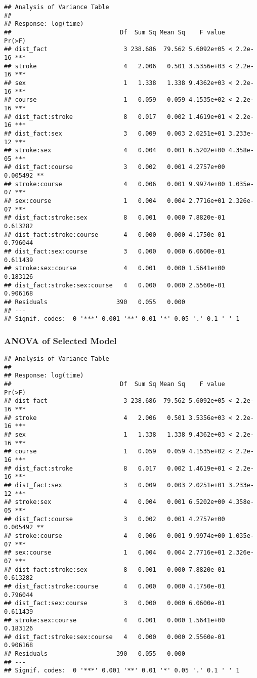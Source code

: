 \documentclass[a4paper,11pt]{article}
\begin{document}
\begin{verbatim}
## Analysis of Variance Table
##
## Response: log(time)
##                              Df  Sum Sq Mean Sq    F value    Pr(>F)
## dist_fact                     3 238.686  79.562 5.6092e+05 < 2.2e-16 ***
## stroke                        4   2.006   0.501 3.5356e+03 < 2.2e-16 ***
## sex                           1   1.338   1.338 9.4362e+03 < 2.2e-16 ***
## course                        1   0.059   0.059 4.1535e+02 < 2.2e-16 ***
## dist_fact:stroke              8   0.017   0.002 1.4619e+01 < 2.2e-16 ***
## dist_fact:sex                 3   0.009   0.003 2.0251e+01 3.233e-12 ***
## stroke:sex                    4   0.004   0.001 6.5202e+00 4.358e-05 ***
## dist_fact:course              3   0.002   0.001 4.2757e+00  0.005492 **
## stroke:course                 4   0.006   0.001 9.9974e+00 1.035e-07 ***
## sex:course                    1   0.004   0.004 2.7716e+01 2.326e-07 ***
## dist_fact:stroke:sex          8   0.001   0.000 7.8820e-01  0.613282
## dist_fact:stroke:course       4   0.000   0.000 4.1750e-01  0.796044
## dist_fact:sex:course          3   0.000   0.000 6.0600e-01  0.611439
## stroke:sex:course             4   0.001   0.000 1.5641e+00  0.183126
## dist_fact:stroke:sex:course   4   0.000   0.000 2.5560e-01  0.906168
## Residuals                   390   0.055   0.000
## ---
## Signif. codes:  0 '***' 0.001 '**' 0.01 '*' 0.05 '.' 0.1 ' ' 1
\end{verbatim}

\subsubsection{ANOVA of Selected Model}

\begin{verbatim}
## Analysis of Variance Table
##
## Response: log(time)
##                              Df  Sum Sq Mean Sq    F value    Pr(>F)
## dist_fact                     3 238.686  79.562 5.6092e+05 < 2.2e-16 ***
## stroke                        4   2.006   0.501 3.5356e+03 < 2.2e-16 ***
## sex                           1   1.338   1.338 9.4362e+03 < 2.2e-16 ***
## course                        1   0.059   0.059 4.1535e+02 < 2.2e-16 ***
## dist_fact:stroke              8   0.017   0.002 1.4619e+01 < 2.2e-16 ***
## dist_fact:sex                 3   0.009   0.003 2.0251e+01 3.233e-12 ***
## stroke:sex                    4   0.004   0.001 6.5202e+00 4.358e-05 ***
## dist_fact:course              3   0.002   0.001 4.2757e+00  0.005492 **
## stroke:course                 4   0.006   0.001 9.9974e+00 1.035e-07 ***
## sex:course                    1   0.004   0.004 2.7716e+01 2.326e-07 ***
## dist_fact:stroke:sex          8   0.001   0.000 7.8820e-01  0.613282
## dist_fact:stroke:course       4   0.000   0.000 4.1750e-01  0.796044
## dist_fact:sex:course          3   0.000   0.000 6.0600e-01  0.611439
## stroke:sex:course             4   0.001   0.000 1.5641e+00  0.183126
## dist_fact:stroke:sex:course   4   0.000   0.000 2.5560e-01  0.906168
## Residuals                   390   0.055   0.000
## ---
## Signif. codes:  0 '***' 0.001 '**' 0.01 '*' 0.05 '.' 0.1 ' ' 1
\end{verbatim}

 
\end{document}
